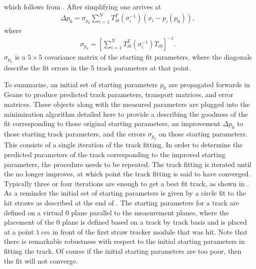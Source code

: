 which follows from . After simplifying one arrives at 
    \begin{align} \label{eq:deltap}
        \Delta p_{0} = \sigma_{p_{0}} \sum_{i=1}^{N} T^{T}_{i0}(\sigma_{i}^{-1})(x_{i} - p_{i}(p_{0})),
    \end{align}
where
    \begin{align} \label{eq:cov}
        \sigma_{p_{0}} = [\sum_{i=1}^{N} T^{T}_{i0} (\sigma_{i}^{-1}) T_{i0} ]^{-1}.
    \end{align}
$\sigma_{p_{0}}$ is a $5 \times 5$ covariance matrix of the starting fit parameters, where the diagonals describe the fit errors in the 5 track parameters at that point. 

To summarize, an initial set of starting parameters $p_{0}$ are propagated forwards in Geane to produce predicted track parameters, transport matrices, and error matrices. These objects along with the measured parameters are plugged into the \chisq minimization algorithm detailed here to provide a \chisq describing the goodness of the fit corresponding to those original starting parameters, an improvement $\Delta p_{0}$ to those starting track parameters, and the errors $\sigma_{p_{0}}$ on those starting parameters. This consists of a single iteration of the track fitting. In order to determine the predicted parameters of the track corresponding to the improved starting parameters, the procedure needs to be repeated. The track fitting is iterated until the \chisq no longer improves, at which point the track fitting is said to have converged. Typically three or four iterations are enough to get a best fit track, as shown in . As a reminder the initial set of starting parameters is given by a circle fit to the hit straws as described at the end of . The starting parameters for a track are defined on a virtual $0$ plane parallel to the measurement planes, where the placement of the $0$ plane is defined based on a track by track basis and is placed at a point $\SI{1}{cm}$ in front of the first straw tracker module that was hit. Note that there is remarkable robustness with respect to the initial starting parameters in fitting the track. Of course if the initial starting parameters are too poor, then the fit will not converge. 







